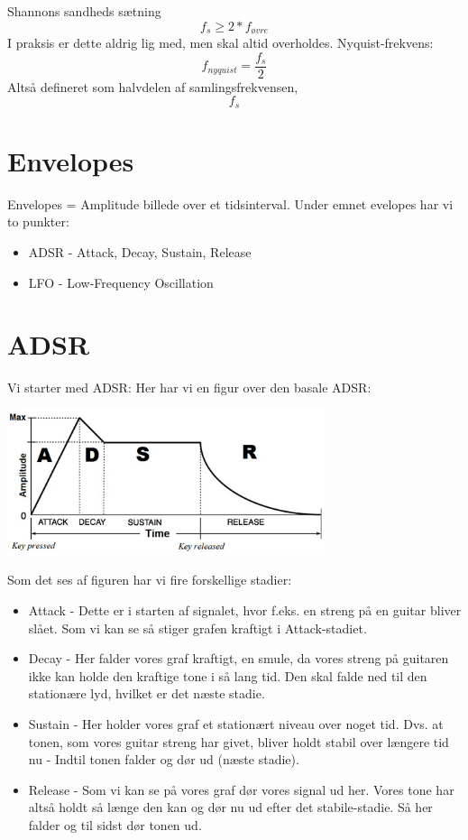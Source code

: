 \documentclass[12pt, letterpaper]{article}
\begin{document}
Shannons sandheds sætning
$$f_s\geq 2*f_{øvre}$$
I praksis er dette aldrig lig med, men skal altid overholdes. 
Nyquist-frekvens:
$$f_{nyquist} = \frac{f_s}{2}$$
Altså defineret som halvdelen af samlingsfrekvensen, $$f_s$$

\section{Envelopes}

Envelopes = Amplitude billede over et tidsinterval. 
Under emnet evelopes har vi to punkter: 
\begin{itemize}
\item ADSR - Attack, Decay, Sustain, Release
\item LFO - Low-Frequency Oscillation
\end{itemize}


\section{ADSR}


Vi starter med ADSR: 
Her har vi en figur over den basale ADSR: 

\begin{center}
\includegraphics[width=0.7\textwidth]{billeder/ADSR}
\end{center}

Som det ses af figuren har vi fire forskellige stadier: 
\begin{itemize}
\item Attack - Dette er i starten af signalet, hvor f.eks. en streng på en guitar bliver slået. Som vi kan se så stiger grafen kraftigt i Attack-stadiet. 
\item Decay - Her falder vores graf kraftigt, en smule, da vores streng på guitaren ikke kan holde den kraftige tone i så lang tid. Den skal falde ned til den stationære lyd, hvilket er det næste stadie.  
\item Sustain - Her holder vores graf et stationært niveau over noget tid. Dvs. at tonen, som vores guitar streng har givet, bliver holdt stabil over længere tid nu - Indtil tonen falder og dør ud (næste stadie). 
\item Release - Som vi kan se på vores graf dør vores signal ud her. Vores tone har altså holdt så længe den kan og dør nu ud efter det stabile-stadie. Så her falder og til sidst dør tonen ud. 
\end{itemize}
\newpage
\end{document}
